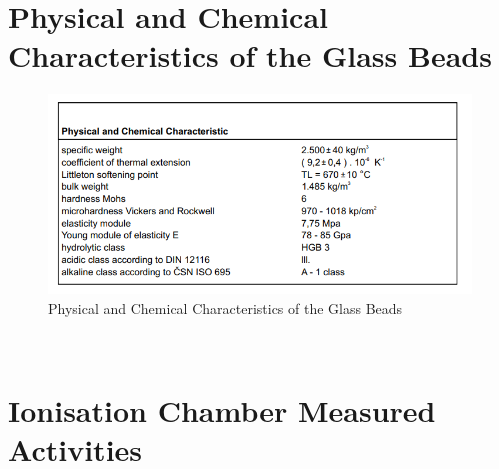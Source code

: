 \documentclass[]{article}
\begin{document}
\begin{appendix}
	\section{Physical and Chemical Characteristics of the Glass Beads}
	\begin{figure}[h!]
		\includegraphics[width = 12cm]{characteristicsOFglass.PNG}
		\centering
		\captionsetup{justification=centering,margin=2cm}
		\caption{Physical and Chemical Characteristics of the Glass Beads\cite{glassbeads}}
	\end{figure}~\\
	

	\pagebreak
	\section{Ionisation Chamber Measured Activities}
	

\end{appendix}
\end{document}
